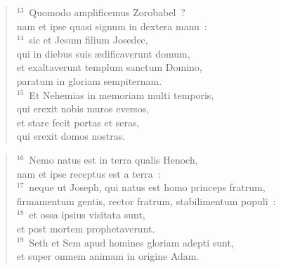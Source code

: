 \begin{verse}${}^{13}$~Quomodo amplificemus Zorobabel~?\\ nam et ipse quasi signum in dextera manu~:\\
${}^{14}$~sic et Jesum filium Josedec,\\ qui in diebus suis \ae dificaverunt domum,\\ et exaltaverunt templum sanctum Domino,\\ paratum in gloriam sempiternam.\\
${}^{15}$~Et Nehemias in memoriam multi temporis,\\ qui erexit nobis muros eversos,\\ et stare fecit portas et seras,\\ qui erexit domos nostras.\end{verse}


\begin{verse}${}^{16}$~Nemo natus est in terra qualis Henoch,\\ nam et ipse receptus est a terra~:\\
${}^{17}$~neque ut Joseph, qui natus est homo princeps fratrum,\\ firmamentum gentis, rector fratrum, stabilimentum populi~:\\
${}^{18}$~et ossa ipsius visitata sunt,\\ et post mortem prophetaverunt.\\
${}^{19}$~Seth et Sem apud homines gloriam adepti sunt,\\ et super omnem animam in origine Adam.\end{verse}


